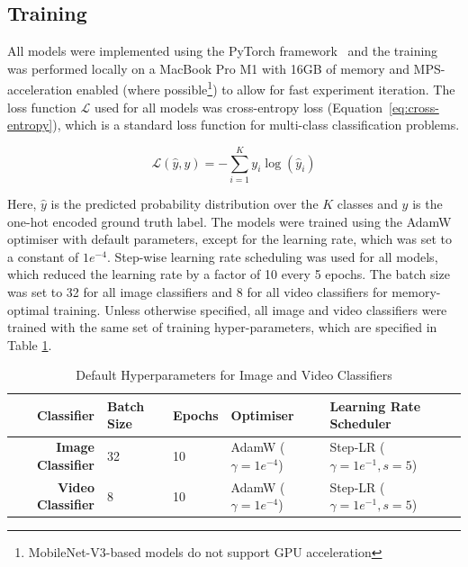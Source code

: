 \documentclass[a4paper]{article}
\begin{document}

  \subsection{Training} %
  \label{sub:training}

  All models were implemented using the PyTorch framework~\cite{pytorch} and the
  training was performed locally on a MacBook Pro M1 with 16GB of memory and
  MPS-acceleration enabled (where possible\footnote{MobileNet-V3-based models do
  not support GPU acceleration}) to allow for fast experiment iteration. The
  loss function $\mathcal{L}$ used for all models was cross-entropy loss
  (Equation~\ref{eq:cross-entropy}), which
  is a standard loss function for multi-class classification problems.

  \begin{equation}
    \mathcal{L}(\hat{y},y) = -\sum_{i=1}^{K} y_i \log(\hat{y}_i)
    \label{eq:cross-entropy}
  \end{equation}

  Here, $\hat{y}$ is the predicted probability distribution over the $K$ classes
  and $y$ is the one-hot encoded ground truth label. The models were trained
  using the AdamW~\cite{adamw} optimiser with default parameters, except for the
  learning rate, which was set to a constant of $1e^{-4}$. Step-wise learning
  rate scheduling was used for all models, which reduced the learning rate by a
  factor of 10 every 5 epochs. The batch size was set to 32 for all image
  classifiers and 8 for all video classifiers for memory-optimal training.
  Unless otherwise specified, all image and video classifiers were trained with
  the same set of training hyper-parameters, which are specified in Table
  \ref{tab:default-hyperparams}. 

  \begin{table}[ht]
    \centering
    \begin{tabular}{rllll}
      \toprule
      Classifier & Batch Size & Epochs & Optimiser & Learning Rate Scheduler \\
      \midrule
      \bfseries Image Classifier & 32 & 10 & AdamW ($\gamma=1e^{-4}$) & Step-LR
      ($\gamma=1e^{-1}, s=5$) \\
      \bfseries Video Classifier & 8 & 10 & AdamW ($\gamma=1e^{-4}$) & Step-LR
      ($\gamma=1e^{-1}, s=5$) \\
      \bottomrule
    \end{tabular}
    \caption{Default Hyperparameters for Image and Video Classifiers}
    \label{tab:default-hyperparams}
  \end{table}
\end{document}
